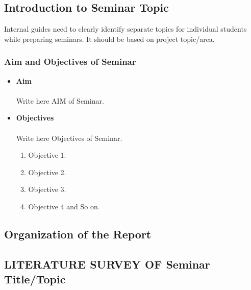 \documentclass[11pt,a4paper]{article}
\begin{document}
\subsection{ Introduction to Seminar Topic}

Internal guides need to clearly identify separate topics for individual 
students while preparing seminars. It should be based on project topic/area.
\subsubsection{Aim and Objectives of Seminar}

\begin{itemize}
\item {\textbf{Aim}}
\paragraph{}Write here AIM of Seminar.\\
\item {\textbf{Objectives}}
\paragraph{}Write here Objectives of Seminar.
\begin{enumerate}
\item Objective 1. 
\item Objective 2. 
\item Objective 3.
\item Objective 4 and So on.
\end{enumerate}
\end{itemize}

\subsection{ Organization of the Report}



\newpage
\begin{center}
\section{LITERATURE SURVEY OF Seminar Title/Topic}
{\setlength{\baselineskip}{1.5\baselineskip} }									
\end{center}
\end{document}
